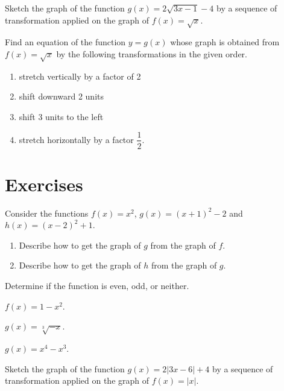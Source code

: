 \newpage
\begin{example}
Sketch the graph of the function $g(x)=2\sqrt{3x-1}-4$ by a sequence of transformation applied on the graph of $f(x)=\sqrt{x}$.  
\end{example}

\begin{example}
  Find an equation of the function $y=g(x)$ whose graph is obtained from $f(x)=\sqrt{x}$ by the following transformations in the given order.
  \begin{enumerate}
    \item stretch vertically by a factor of 2
    \item shift downward 2 units
    \item shift 3 units to the left
    \item stretch horizontally by a factor $\dfrac{1}{2}$.
  \end{enumerate}
\end{example}

\newpage

\section*{Exercises}

\begin{exercise}
    Consider the functions $f(x)=x^2$, $g(x)=(x+1)^2-2$ and $h(x)=(x-2)^2+1$.
    \begin{enumerate}
      \item Describe how to get the graph of $g$ from the graph of $f$.
      \item Describe how to get the graph of $h$ from the graph of $g$.
    \end{enumerate}
\end{exercise}

\begin{exercise}
    Determine if the function is even, odd, or neither.\\
    \begin{enumerate*}
      \item $f(x)=1-x^2$.
      \item $g(x)=\sqrt[3]{-x}$.
      \item $g(x)=x^4-x^3$.
      \hfill\mbox{}
    \end{enumerate*}  
\end{exercise}

\newpage

\begin{exercise}
  Sketch the graph of the function $g(x)=2|3x-6| + 4$ by a sequence of transformation applied on the graph of $f(x)=|x|$.  
\end{exercise}


